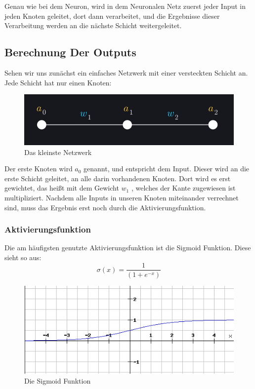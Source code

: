 \documentclass[12pt]{article}
\begin{document}
  Genau wie bei dem Neuron, wird in dem Neuronalen Netz zuerst jeder Input in jeden Knoten geleitet, dort dann verarbeitet, und die Ergebnisse dieser Verarbeitung werden an die nächste Schicht weitergeleitet.\subsection{Berechnung Der Outputs}Sehen wir uns zunächst ein einfaches Netzwerk mit einer versteckten Schicht an. Jede Schicht hat nur einen Knoten:
\begin{figure}[H]
\centering
\includegraphics[scale=0.5]{./Images/Pasted image 20230912184748.png}
\caption{Das kleinste Netzwerk}
\label{Das kleinste Netzwerk}
\end{figure}Der erste Knoten wird $a_0$ genannt, und entspricht dem Input. Dieser wird an die erste Schicht geleitet, an alle darin vorhandenen Knoten. Dort wird es erst gewichtet, das heißt mit dem Gewicht $w_1$ , welches der Kante zugewiesen ist multipliziert. Nachdem alle Inputs in unseren Knoten miteinander verrechnet sind, muss das Ergebnis erst noch durch die Aktivierungsfunktion.\subsubsection{Aktivierungsfunktion}Die am häufigsten genutzte Aktivierungsfunktion ist die Sigmoid Funktion. Diese sieht so aus:
$$\sigma (x)=\frac{1}{(1+e^{-x})}$$
\begin{figure}[H]
\centering
\includegraphics[scale=0.70]{./Images/Pasted image 20230912192401.png}
\caption{Die Sigmoid Funktion}
\label{Die Sigmoid Funktion}
\end{figure}
\end{document}
